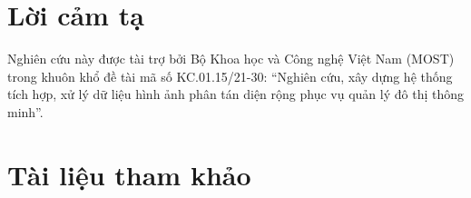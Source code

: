 \documentclass{jstarticle}
\begin{document}
\section*{Lời cảm tạ}
Nghiên cứu này được tài trợ bởi Bộ Khoa học và Công nghệ Việt Nam (MOST) trong khuôn khổ đề tài mã số KC.01.15/21-30: “Nghiên cứu, xây dựng hệ thống tích hợp, xử lý dữ liệu hình ảnh phân tán diện rộng phục vụ quản lý đô thị thông minh”.
\section*{Tài liệu tham khảo}

\printbibliography[heading=none]
\end{document}
